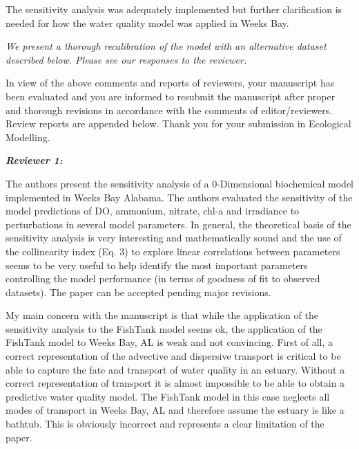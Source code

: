 \documentclass[letterpaper,12pt]{article}\usepackage[]{graphicx}\usepackage[]{color}
\newcommand{\Bigtxt}[1]{\textbf{\textit{#1}}}
\begin{document}
The sensitivity analysis was adequately implemented but further clarification is needed for how the water quality model was applied in Weeks Bay. 

{\it We present a thorough recalibration of the model with an alternative dataset described below.  Please see our responses to the reviewer.}

In view of the above comments and reports of reviewers, your manuscript has been evaluated and you are informed to resubmit the manuscript after proper and thorough revisions in accordance with the comments of editor/reviewers. Review reports are appended below. Thank you for your submission in Ecological Modelling. 

\Bigtxt{Reviewer 1:}

The authors present the sensitivity analysis of a 0-Dimensional biochemical model implemented in Weeks Bay Alabama. The authors evaluated the sensitivity of the model predictions of DO, ammonium, nitrate, chl-a and irradiance to perturbations in several model parameters. In general, the theoretical basis of the sensitivity analysis is very interesting and mathematically sound and the use of the collinearity index (Eq. 3) to explore linear correlations between parameters seems to be very useful to help identify the most important parameters controlling the model performance (in terms of goodness of fit to observed datasets). The paper can be accepted pending major revisions. 

My main concern with the manuscript is that while the application of the sensitivity analysis to the FishTank model seems ok, the application of the FishTank model to Weeks Bay, AL is weak and not convincing. First of all, a correct representation of the advective and dispersive transport is critical to be able to capture the fate and transport of water quality in an estuary. Without a correct representation of transport it is almost impossible to be able to obtain a predictive water quality model. The FishTank model in this case neglects all modes of transport in Weeks Bay, AL and therefore assume the estuary is like a bathtub. This is obviously incorrect and represents a clear limitation of the paper.
\end{document}
